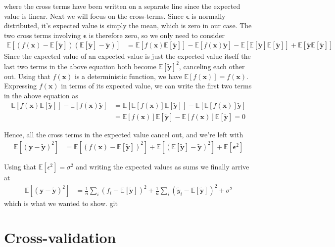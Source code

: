 \documentclass[reprint,english,notitlepage,aps,nobalancelastpage,nofootinbib]{revtex4-1}  %
\newcommand{\expy}{\mathbb{E}[\mathbf{\tilde{y}}]}
\newcommand{\closed}[1]{\left({#1}\right)}
\newcommand{\bracket}[1]{\left[{#1}\right]}
\begin{document}
where the cross terms have been written on a separate line since the expected value is linear. Next we will focus on the cross-terms. Since $\bm{\epsilon}$ is normally distributed, it's expected value is simply the mean, which is zero in our case. The two cross terms involving $\bm{\epsilon}$ is therefore zero, so we only need to consider
\begin{align*}
  \mathbb{E}\bracket{(f(\mathbf{x}) - \expy)(\expy - \mathbf{\tilde{y}})} &= \mathbb{E}\bracket{f(\mathbf{x})\expy} - \mathbb{E}\bracket{f(\mathbf{x})\mathbf{\tilde{y}}} - \mathbb{E}\bracket{\expy\expy} + \mathbb{E}\bracket{\mathbf{\tilde{y}}\expy}
\end{align*}
Since the expected value of an expected value is just the expected value itself the last two terms in the above equation both become $\expy^2$, canceling each other out. Using that $f(\mathbf{x})$ is a deterministic function, we have $\mathbb{E}[f(\mathbf{x})]=f(\mathbf{x})$. Expressing $f(\mathbf{x})$ in terms of its expected value, we can write the first two terms in the above equation as
\begin{align*}
  \mathbb{E}\bracket{f(\mathbf{x})\expy} - \mathbb{E}\bracket{f(\mathbf{x})\mathbf{\tilde{y}}} &= \mathbb{E}\bracket{\mathbb{E}\bracket{f(\mathbf{x})}\expy} - \mathbb{E}\bracket{\mathbb{E}\bracket{f(\mathbf{x})}\mathbf{\tilde{y}}} \\
  &= \mathbb{E}\bracket{f(\mathbf{x})}\expy - \mathbb{E}\bracket{f(\mathbf{x})}\expy = 0
\end{align*}

Hence, all the cross terms in the expected value cancel out, and we're left with
\begin{align*}
  \mathbb{E}\left[(\mathbf{y} - \mathbf{\tilde{y}})^2\right] &= \mathbb{E}\bracket{\closed{f(\mathbf{x})-\expy}^2} + \mathbb{E}\bracket{\closed{\expy - \mathbf{\tilde{y}}}^2} + \mathbb{E}\bracket{\bm{\epsilon}^2}
\end{align*}

Using that $\mathbb{E}[\epsilon^2]=\sigma^2$ and writing the expected values as sums we finally arrive at
\begin{align*}
  \mathbb{E}\left[(\mathbf{y} - \mathbf{\tilde{y}})^2\right] &= \frac{1}{n} \sum_i (f_i - \expy)^2 + \frac{1}{n}\sum_i (\tilde{y}_i - \expy )^2 + \sigma^2
\end{align*}
which is what we wanted to show. git

\section{Cross-validation}
\end{document}

